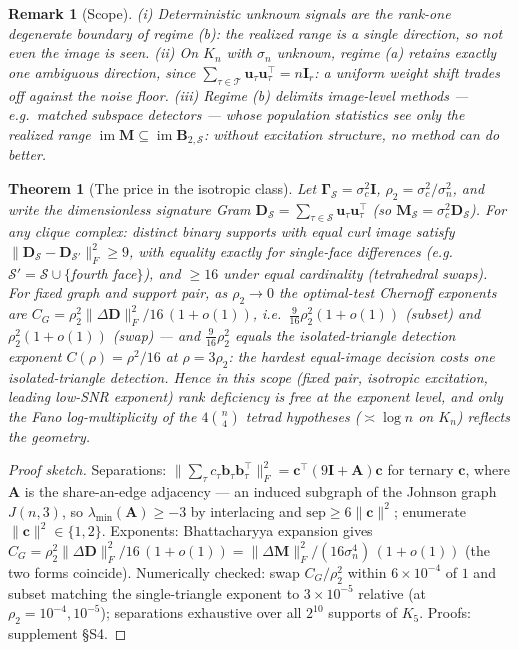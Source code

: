 \documentclass{article}
\newtheorem{theorem}{Theorem}
\newtheorem{remark}{Remark}
\DeclareMathOperator{\im}{im}
\newcommand{\B}{\bm{B}}
\newcommand{\Scal}{\mathcal{S}}
\newcommand{\Tcal}{\mathcal{T}}
\newcommand{\Gam}{\bm{\Gamma}}
\begin{document}
\begin{remark}[Scope]\label{rem:scope}
(i) Deterministic unknown signals are the rank-one degenerate boundary of
regime (b): the realized range is a single direction, so not even the image is
seen. (ii) On $K_n$ with $\sigma_n$
\emph{unknown}, regime (a) retains exactly one ambiguous direction, since
$\sum_{\tau\in\Tcal}\bm u_\tau\bm u_\tau^{\!\top}=n\bm I_r$: a uniform weight
shift trades off against the noise floor. (iii) Regime (b) delimits
image-level methods --- e.g.\ matched subspace detectors
\cite{liu2025matched} --- whose population statistics see only the realized
range $\im\bm M\subseteq\im\B_{2,\Scal}$: without excitation structure, no
method can do better.
\end{remark}

\begin{theorem}[The price in the isotropic class]\label{thm:price}
Let $\Gam_\Scal=\sigma_c^2\bm I$, $\rho_2=\sigma_c^2/\sigma_n^2$, and write the
dimensionless signature Gram $\bm D_\Scal=\sum_{\tau\in\Scal}\bm u_\tau\bm u_\tau^{\!\top}$
(so $\bm M_\Scal=\sigma_c^2\bm D_\Scal$). For \emph{any} clique complex:
distinct binary supports with equal curl image satisfy
$\|\bm D_\Scal-\bm D_{\Scal'}\|_F^2\ge 9$, with equality exactly for
single-face differences (e.g.\ $\Scal'=\Scal\cup\{$fourth face$\}$), and
$\ge16$ under equal cardinality (tetrahedral swaps). For fixed graph and
support pair, as $\rho_2\to0$ the optimal-test Chernoff exponents are
$C_G=\rho_2^2\|\Delta\bm D\|_F^2/16\,(1+o(1))$, i.e.\
$\tfrac9{16}\rho_2^2(1+o(1))$ (subset) and $\rho_2^2(1+o(1))$ (swap) --- and
$\tfrac9{16}\rho_2^2$ \emph{equals} the isolated-triangle detection exponent
$C(\rho)=\rho^2/16$ at $\rho=3\rho_2$: the hardest equal-image decision costs
one isolated-triangle detection. Hence \emph{in this scope} (fixed pair,
isotropic excitation, leading low-SNR exponent) rank deficiency is free at the
exponent level, and only the Fano log-multiplicity of the $4\binom n4$ tetrad
hypotheses ($\asymp\log n$ on $K_n$) reflects the geometry.
\end{theorem}
\begin{proof}[Proof sketch]
Separations: $\|\sum_\tau c_\tau\bm b_\tau\bm b_\tau^{\!\top}\|_F^2
=\bm c^{\!\top}(9\bm I+\bm A)\bm c$ for ternary $\bm c$, where $\bm A$ is the
share-an-edge adjacency --- an induced subgraph of the Johnson graph
$J(n,3)$, so $\lambda_{\min}(\bm A)\ge-3$ by interlacing and
$\mathrm{sep}\ge6\|\bm c\|^2$; enumerate $\|\bm c\|^2\in\{1,2\}$.
Exponents: Bhattacharyya expansion gives
$C_G=\rho_2^2\|\Delta\bm D\|_F^2/16\,(1+o(1))
=\|\Delta\bm M\|_F^2/(16\sigma_n^4)\,(1+o(1))$ (the two forms coincide).
Numerically checked: swap $C_G/\rho_2^2$ within $6\times10^{-4}$ of $1$ and
subset matching the single-triangle exponent to $3\times10^{-5}$ relative (at
$\rho_2=10^{-4},10^{-5}$); separations exhaustive over all $2^{10}$ supports
of $K_5$. Proofs: supplement \S S4.
\end{proof}
\end{document}
